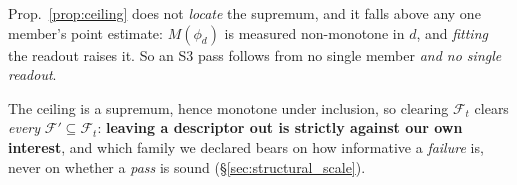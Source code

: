 \begin{corollary}
\label{cor:supremum}
Prop.~\ref{prop:ceiling} does not \emph{locate} the supremum, and it falls above any one member's point estimate: $M(\phi_d)$ is measured non-monotone in $d$, and \emph{fitting} the readout raises it. So an S3 pass follows from no single member \emph{and no single readout}.
\end{corollary}

\begin{corollary}
\label{cor:monotone_family}
The ceiling is a supremum, hence monotone under inclusion, so clearing $\mathcal{F}_t$ clears \emph{every} $\mathcal{F}'\subseteq\mathcal{F}_t$: \textbf{leaving a descriptor out is strictly against our own interest}, and which family we declared bears on how informative a \emph{failure} is, never on whether a \emph{pass} is sound (\S\ref{sec:structural_scale}).
\end{corollary}

